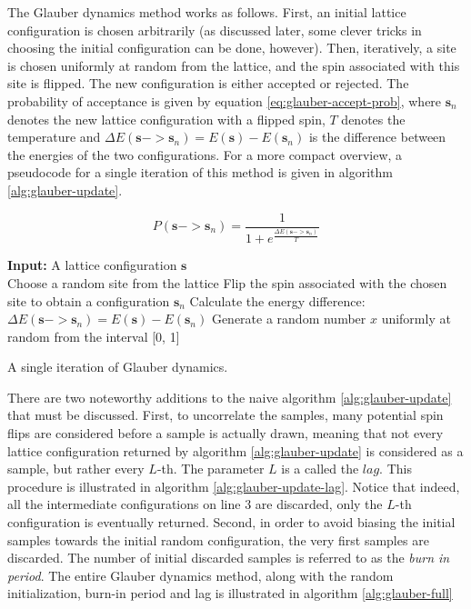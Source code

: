 \documentclass[12pt]{article}
\begin{document}
The Glauber dynamics method works as follows. First, an initial lattice configuration is chosen arbitrarily (as discussed later, some clever tricks in choosing the initial configuration can be done, however). Then, iteratively, a site is chosen uniformly at random from the lattice, and the spin associated with this site is flipped. The new configuration is either accepted or rejected. The probability of acceptance is given by equation \ref{eq:glauber-accept-prob}, where $\boldsymbol{s}_n$ denotes the new lattice configuration with a flipped spin, $T$ denotes the temperature and $\Delta E(\boldsymbol{s} -> \boldsymbol{s}_n) = E(\boldsymbol{s}) - E(\boldsymbol{s}_{n})$ is the difference between the energies of the two configurations. For a more compact overview, a pseudocode for a single iteration of this method is given in algorithm \ref{alg:glauber-update}.

\begin{equation}
P(\boldsymbol{s} -> \boldsymbol{s}_{n}) = \frac{1}{1 + e^\frac{\Delta E(\boldsymbol{s} -> \boldsymbol{s}_n)}{T}}
\label{eq:glauber-accept-prob}
\end{equation}

\begin{algorithm}
\textbf{Input:} A lattice configuration $\boldsymbol{s}$ \\
Choose a random site from the lattice\;
Flip the spin associated with the chosen site to obtain a configuration $\boldsymbol{s}_n$\;
Calculate the energy difference: $\Delta E(\boldsymbol{s} -> \boldsymbol{s}_n) = E(\boldsymbol{s}) - E(\boldsymbol{s}_{n})$\;
Generate a random number $x$ uniformly at random from the interval [0, 1]\;
\label{alg:glauber-update}
\caption{A single iteration of Glauber dynamics.}
\end{algorithm}

There are two noteworthy additions to the naive algorithm \ref{alg:glauber-update} that must be discussed. First, to uncorrelate the samples, many potential spin flips are considered before a sample is actually drawn, meaning that not every lattice configuration returned by algorithm \ref{alg:glauber-update} is considered as a sample, but rather every $L$-th. The parameter $L$ is a called the $lag$. This procedure is illustrated in algorithm \ref{alg:glauber-update-lag}. Notice that indeed, all the intermediate configurations on line $3$ are discarded,  only the $L$-th configuration is eventually returned. Second, in order to avoid biasing the initial samples towards the initial random configuration, the very first samples are discarded. The number of initial discarded samples is referred to as the \textit{burn in period}. The entire Glauber dynamics method, along with the random initialization, burn-in period and lag is illustrated in algorithm \ref{alg:glauber-full}
\end{document}
